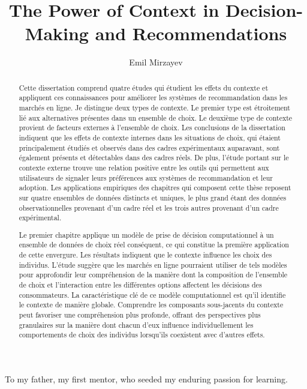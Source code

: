 \documentclass[a4paper,12pt]{article}
\title{{\bf \Large The Power of Context in Decision-Making and Recommendations}
}
\author{Emil Mirzayev}
\newenvironment{dedication}
  {%
   \thispagestyle{empty}%
   \vspace*{\stretch{1}}%
   \itshape             %
   \raggedleft          %
  }
  {\par %
   \vspace{\stretch{3}} %
   \clearpage           %
  }
\begin{document}
\begin{dedication}

To my father, my first mentor, who seeded my enduring passion for learning.

\end{dedication}

\maketitle

\clearpage
\begin{otherlanguage}{french}
\begin{abstract}

    Cette dissertation comprend quatre études qui étudient les effets du contexte et appliquent ces connaissances pour améliorer les systèmes de recommandation dans les marchés en ligne. Je distingue deux types de contexte. Le premier type est étroitement lié aux alternatives présentes dans un ensemble de choix. Le deuxième type de contexte provient de facteurs externes à l'ensemble de choix. Les conclusions de la dissertation indiquent que les effets de contexte internes dans les situations de choix, qui étaient principalement étudiés et observés dans des cadres expérimentaux auparavant, sont également présents et détectables dans des cadres réels. De plus, l'étude portant sur le contexte externe trouve une relation positive entre les outils qui permettent aux utilisateurs de signaler leurs préférences aux systèmes de recommandation et leur adoption. Les applications empiriques des chapitres qui composent cette thèse reposent sur quatre ensembles de données distincts et uniques, le plus grand étant des données observationnelles provenant d'un cadre réel et les trois autres provenant d'un cadre expérimental.

    Le premier chapitre applique un modèle de prise de décision computationnel à un ensemble de données de choix réel conséquent, ce qui constitue la première application de cette envergure. Les résultats indiquent que le contexte influence les choix des individus. L'étude suggère que les marchés en ligne pourraient utiliser de tels modèles pour approfondir leur compréhension de la manière dont la composition de l'ensemble de choix et l'interaction entre les différentes options affectent les décisions des consommateurs. La caractéristique clé de ce modèle computationnel est qu'il identifie le contexte de manière globale. Comprendre les composants sous-jacents du contexte peut favoriser une compréhension plus profonde, offrant des perspectives plus granulaires sur la manière dont chacun d'eux influence individuellement les comportements de choix des individus lorsqu'ils coexistent avec d'autres effets.
    

\end{abstract}
\end{otherlanguage}
\end{document}
